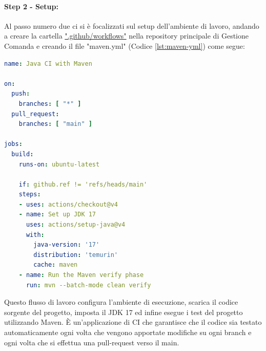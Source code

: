 \paragraph{Step 2 - Setup:}
Al passo numero due ci si è focalizzati sul setup dell’ambiente di lavoro, andando a creare la cartella \href{https://github.com/giorgio-hash/GestioneComanda/tree/main/.github/workflows}{".github/workflows"} nella repository principale di Gestione Comanda e creando il file "maven.yml" (Codice \vref{lst:maven-yml}) come segue:
\begin{lstlisting}[language=yaml, caption={Creazione del file maven.yml}, label=lst:maven-yml]
name: Java CI with Maven

on:
  push:
    branches: [ "*" ]
  pull_request:
    branches: [ "main" ]

jobs:
  build:
    runs-on: ubuntu-latest
    
    if: github.ref != 'refs/heads/main'
    steps:
    - uses: actions/checkout@v4
    - name: Set up JDK 17
      uses: actions/setup-java@v4
      with:
        java-version: '17'
        distribution: 'temurin'
        cache: maven
    - name: Run the Maven verify phase
      run: mvn --batch-mode clean verify
\end{lstlisting}
Questo flusso di lavoro configura l'ambiente di esecuzione, scarica il codice sorgente del progetto, imposta il JDK 17 ed infine esegue i test del progetto utilizzando Maven. È un'applicazione di CI che garantisce che il codice sia testato automaticamente ogni volta che vengono apportate modifiche su ogni branch e ogni volta che si effettua una pull-request verso il main.
